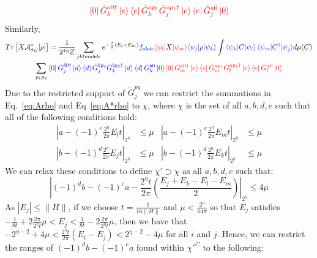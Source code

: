 \documentclass[aps,floatfix,10pt,amssymb,amsfont,amsmath,superscriptaddress,float,nofootinbib,longbibliography,nobalancelastpage,twocolumn]{revtex4-2}
\begin{document}
\begin{widetext}
\begin{multline}
    \textcolor{red}{\bra{0}\tilde G_k^{a0\dagger}\ket{e}\bra{e}\tilde G_k^{ap_1}\tilde G_j^{ap_1\dagger}\ket{e}\bra{e}\tilde G_j^{a0}\ket{0}}
    \label{eq:Arho}
\end{multline}
Similarly,
\begin{multline}
    Tr\left[X\mathcal{A}^*_{\sigma_G}[\rho]\right] =\frac{1}{2^{4\eta}Z} \sum_{jklmabde} e^{-\frac{\beta}{2}(E_l+E_m)}\textcolor{blue}{f_{abde}} \textcolor{red}{\bra{\psi_l}}X\textcolor{red}{\ket{\psi_m}}\textcolor{blue}{\bra{\psi_j}}\rho\textcolor{blue}{\ket{\psi_k}} \int \textcolor{blue}{\braket{\psi_k|C|\psi_l}\braket{\psi_m|C^{\dagger}|\psi_j}} d\mu(C)\\\sum_{p_1p_2} \textcolor{blue}{\bra{0} \tilde G^{b0\dagger}_j\ket{d}\bra{d}\tilde G^{bp_2}_j\tilde G^{bp_2\dagger}_k\ket{d}\bra{d}\tilde G^{b0}_k\ket{0}}
    \textcolor{red}{\bra{0}\tilde G_m^{a0\dagger}\ket{e}\bra{e}\tilde G_m^{ap_1}\tilde G_l^{ap_1\dagger}\ket{e}\bra{e}\tilde G_l^{a0}\ket{0}}
        \label{eq:A*rho}  
\end{multline}
Due to the restricted support of $\tilde G^{pq}_j$ we can restrict the summations in Eq.~\eqref{eq:Arho} and Eq~\eqref{eq:A*rho} to $\chi$, where $\chi$ is the set of all $a,b,d,e$ such that all of the following conditions hold:
\begin{equation}
\begin{aligned}
    |a-(-1)^e\frac{2^{\eta}}{2\pi}E_lt|_{2^{\eta}} &\leq \mu  &|a-(-1)^e\frac{2^{\eta}}{2\pi}E_mt|_{2^{\eta}} &\leq \mu\\
    |b-(-1)^{d}\frac{2^{\eta}}{2\pi}E_jt|_{2^{\eta}} &\leq \mu   &|b-(-1)^{d}\frac{2^{\eta}}{2\pi}E_kt|_{2^{\eta}}& \leq \mu
\end{aligned}
\end{equation}
 We can relax these conditions to define $\chi' \supset \chi$  as all $a,b, d, e$ such that:
\begin{equation}
\label{eq:condJ}
        |(-1)^db-(-1)^ea -\frac{2^{\eta}t}{2\pi}(\frac{E_j+E_k-E_l-E_m}{2})|_{2^{\eta}} \leq 4\mu
\end{equation}
As $|E_j| \leq \|H\|$, if we choose $t = \frac{1}{16\|H\|}$ and $\mu < \frac{2^{\eta}}{64\pi}$ so that $E_j$ satisfies $-\frac{1}{8t} + 2\frac{2\pi}{2^{\eta}t}\mu < E_j < \frac{1}{8t} - 2\frac{2\pi}{2^{\eta}t}\mu$, then we have that $-2^{\eta-2}+4\mu < \frac{2^{\eta}t}{2\pi}(E_i -E_j) < 2^{\eta-2}-4\mu$ for all $i$ and $j$. Hence, we can restrict the ranges of $(-1)^db-(-1)^ea$ found within $\chi'^C$ to the following:
\begin{multline}

\end{multline}
\end{widetext}
\end{document}
